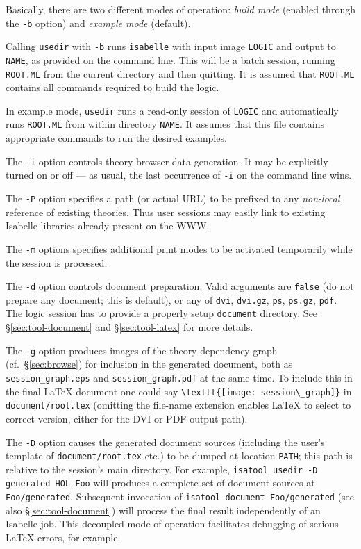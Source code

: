 Basically, there are two different modes of operation: \emph{build mode}
(enabled through the \texttt{-b} option) and \emph{example mode} (default).

Calling \texttt{usedir} with \texttt{-b} runs \texttt{isabelle} with input
image \texttt{LOGIC} and output to \texttt{NAME}, as provided on the command
line. This will be a batch session, running \texttt{ROOT.ML} from the current
directory and then quitting.  It is assumed that \texttt{ROOT.ML} contains all
{\ML} commands required to build the logic.

In example mode, \texttt{usedir} runs a read-only session of \texttt{LOGIC}
and automatically runs \texttt{ROOT.ML} from within directory \texttt{NAME}.
It assumes that this file contains appropriate {\ML} commands to run the
desired examples.

\medskip The \texttt{-i} option controls theory browser data generation. It
may be explicitly turned on or off --- as usual, the last occurrence of
\texttt{-i} on the command line wins.

The \texttt{-P} option specifies a path (or actual URL) to be prefixed to any
\emph{non-local} reference of existing theories.  Thus user sessions may
easily link to existing Isabelle libraries already present on the WWW.

The \texttt{-m} options specifies additional print modes to be activated
temporarily while the session is processed.

\medskip The \texttt{-d} option controls document preparation.  Valid
arguments are \texttt{false} (do not prepare any document; this is default),
or any of \texttt{dvi}, \texttt{dvi.gz}, \texttt{ps}, \texttt{ps.gz},
\texttt{pdf}.  The logic session has to provide a properly setup
\texttt{document} directory.  See \S\ref{sec:tool-document} and
\S\ref{sec:tool-latex} for more details.

The \texttt{-g} option produces images of the theory dependency graph (cf.\ 
\S\ref{sec:browse}) for inclusion in the generated document, both as
\texttt{session_graph.eps} and \texttt{session_graph.pdf} at the same time.
To include this in the final {\LaTeX} document one could say
\verb,\texttt{[image: session\_graph]}, in \texttt{document/root.tex} (omitting
the file-name extension enables {\LaTeX} to select to correct version, either
for the DVI or PDF output path).

\medskip The \texttt{-D} option causes the generated document sources
(including the user's template of \texttt{document/root.tex} etc.) to be
dumped at location \texttt{PATH}; this path is relative to the session's main
directory.  For example, \texttt{isatool usedir -D generated HOL Foo} will
produces a complete set of document sources at \texttt{Foo/generated}.
Subsequent invocation of \texttt{isatool document Foo/generated} (see also
\S\ref{sec:tool-document}) will process the final result independently of an
Isabelle job.  This decoupled mode of operation facilitates debugging of
serious {\LaTeX} errors, for example.

